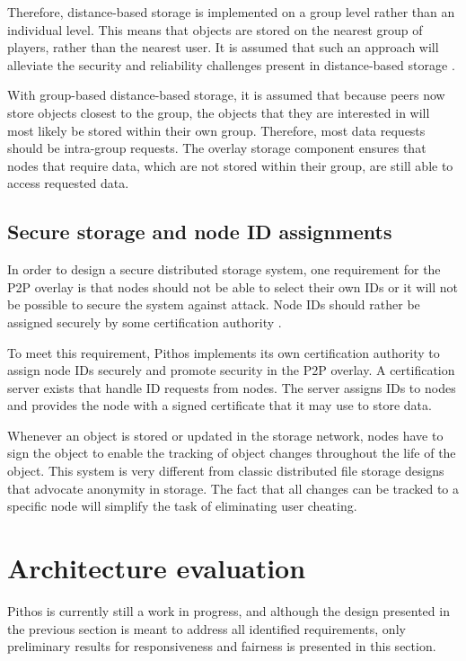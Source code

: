 \documentclass[10pt,a4paper,conference]{IEEEtran}
\begin{document}
Therefore, distance-based storage is implemented on a group level rather than an individual level. This means that objects are stored on the nearest
group of players, rather than the nearest user. It is assumed that such an approach will alleviate the security and reliability challenges present in
distance-based storage \cite{gilmore_p2p_mmog_state_persistency}.

With group-based distance-based storage, it is assumed that because peers now store objects closest to the group, the objects that they are
interested in will most likely be stored within their own group. Therefore, most data requests should be intra-group requests. The overlay storage
component ensures that nodes that require data, which are not stored within their group, are still able to access requested data.

\subsection{Secure storage and node ID assignments}
\label{secure_ids}

In order to design a secure distributed storage system, one requirement for the P2P overlay is that nodes should not be able to select their own IDs
or it will not be possible to secure the system against attack. Node IDs should rather be assigned securely by some certification authority
\cite{secure_overlay_routing}.

To meet this requirement, Pithos implements its own certification authority to assign node IDs securely and promote security in the P2P overlay. A
certification server exists that handle ID requests from nodes. The server assigns IDs to nodes and provides the node with a signed certificate that
it may use to store data.

Whenever an object is stored or updated in the storage network, nodes have to sign the object to enable the tracking of object changes throughout the
life of the object. This system is very different from classic distributed file storage designs that advocate anonymity in storage. The fact that all
changes can be tracked to a specific node will simplify the task of eliminating user cheating.

\section{Architecture evaluation}
\label{evaluation}

Pithos is currently still a work in progress, and although the design presented in the previous section is meant to address all identified
requirements, only preliminary results for responsiveness and fairness is presented in this section.
\end{document}
